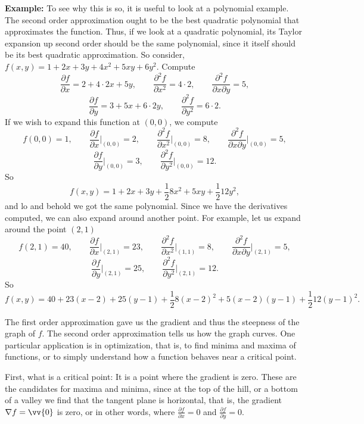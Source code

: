 \documentclass[12pt]{article}
\begin{document}
\medskip

\textbf{Example:}
To see why this is so, it is useful to look at a polynomial example.  The
second order approximation ought to be the best quadratic polynomial that
approximates the function.
Thus, if we look at a quadratic polynomial,
its Taylor expansion up second order should be the
same polynomial,
since it itself should be its best
quadratic approximation.
So consider, $f(x,y) = 1 + 2x + 3y + 4x^2+ 5xy + 6y^2$.  Compute
\[
\frac{\partial f}{\partial x} = 2 + 4 \cdot 2x + 5y, \qquad
\frac{\partial^2 f}{\partial x^2} = 4 \cdot 2, \qquad
\frac{\partial^2 f}{\partial x \partial y} = 5 ,
\]
\[
\frac{\partial f}{\partial y} = 3 + 5x + 6 \cdot 2y, \qquad
\frac{\partial^2 f}{\partial y^2} = 6 \cdot 2 .
\]
If we wish to expand this function at $(0,0)$, we compute
\[
f(0,0) = 1, \qquad
\frac{\partial f}{\partial x}\Big|_{(0,0)} = 2, \qquad
\frac{\partial^2 f}{\partial x^2}\Big|_{(0,0)} = 8, \qquad
\frac{\partial^2 f}{\partial x \partial y}\Big|_{(0,0)} = 5 ,
\]
\[
\frac{\partial f}{\partial y}\Big|_{(0,0)} = 3, \qquad
\frac{\partial^2 f}{\partial y^2}\Big|_{(0,0)} = 12 .
\]
So
\[
f(x,y) = 1 + 2 x + 3 y + \frac{1}{2} 8 x^2 + 5 xy + \frac{1}{2} 12 y^2 ,
\]
and lo and behold we got the same polynomial.
Since we have the derivatives computed, we can also expand around another
point.  For example, let us expand around the point $(2,1)$
\[
f(2,1) = 40, \qquad
\frac{\partial f}{\partial x}\Big|_{(2,1)} = 23, \qquad
\frac{\partial^2 f}{\partial x^2}\Big|_{(1,1)} = 8, \qquad
\frac{\partial^2 f}{\partial x \partial y}\Big|_{(2,1)} = 5 ,
\]
\[
\frac{\partial f}{\partial y}\Big|_{(2,1)} = 25, \qquad
\frac{\partial^2 f}{\partial y^2}\Big|_{(2,1)} = 12 .
\]
So
\[
f(x,y) = 40 + 23(x-2) + 25 (y-1) + \frac{1}{2} 8 (x-2)^2 + 5 (x-2)(y-1) +
\frac{1}{2} 12 (y-1)^2 .
\]

\medskip

The first order approximation gave us the gradient and thus the
steepness of the graph of $f$.  The second order approximation tells us how
the graph curves.  One particular application is in optimization, that is,
to find minima and maxima of functions, or to simply understand how a
function behaves near a critical point.

First, what is a critical point:  It is a point where the gradient is zero.
These are the candidates for maxima and minima, since at the top of the
hill, or a bottom of a valley we find that the tangent plane is horizontal,
that is, the gradient $\nabla f = \vv{0}$ is zero,
or in other words, where
$\frac{\partial f}{\partial x} = 0$ and
$\frac{\partial f}{\partial y} = 0$.
\end{document}
